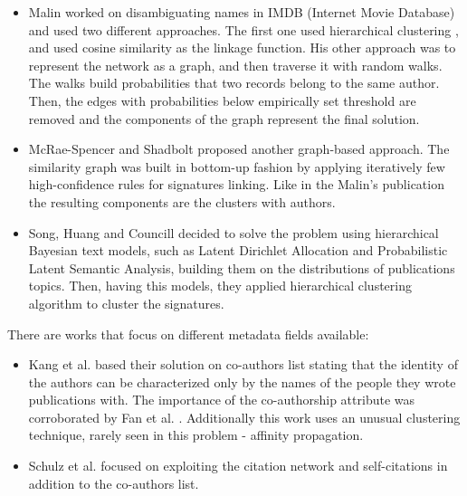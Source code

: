 \documentclass{pracamgr}
\begin{document}
\begin{itemize}

\item{
Malin \citep{malin2005unsupervised} worked on disambiguating names in IMDB (Internet Movie Database) and used two different approaches. The first one used hierarchical clustering
\citep{ward1963hierarchical}, and used cosine similarity as the linkage function. His other
approach was to represent the network as a graph, and then traverse it with random walks.
The walks build probabilities that two records belong to the same author. Then, the edges with
probabilities below empirically set threshold are removed and the components of the graph
represent the final solution.
}

\item{
McRae-Spencer and Shadbolt \citep{mcrae2006also} proposed another graph-based approach.
The similarity graph was built in bottom-up fashion by applying iteratively few high-confidence
rules for signatures linking. Like in the Malin's publication the resulting components are the
clusters with authors.
}

\item{
Song, Huang and Councill \citep{song2007efficient} decided to solve the problem using
hierarchical Bayesian text models, such as Latent Dirichlet Allocation and Probabilistic
Latent Semantic Analysis, building them on the distributions of publications topics. Then,
having this models, they applied hierarchical clustering algorithm to cluster the signatures.
}

\end{itemize}

There are works that focus on different metadata fields available:

\begin{itemize}


\item{
Kang et al. \citep{kang2009co} based their solution on co-authors list stating that the
identity of the authors can be characterized only by the names of the people they wrote
publications with. The importance of the co-authorship attribute was corroborated by Fan
et al. \citep{fan2011graph}. Additionally this work uses an unusual clustering technique,
rarely seen in this problem - affinity propagation.

}

\item{
Schulz et al. \citep{schulz2014exploiting} focused on exploiting the citation
network and self-citations in addition to the co-authors list. 
}

\end{itemize}
\end{document}
